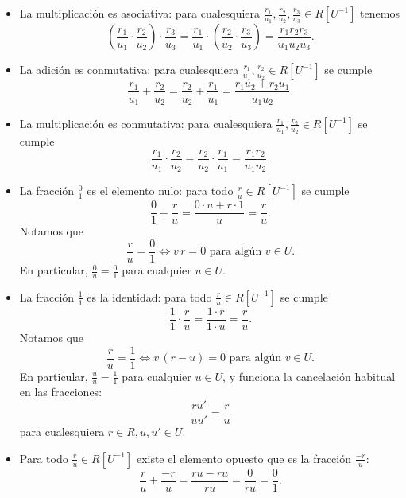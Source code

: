 \begin{construccion}
\begin{enumerate}
\begin{itemize}
    \item La multiplicación es asociativa: para cualesquiera
      $\frac{r_1}{u_1},\frac{r_2}{u_2},\frac{r_3}{u_3}\in R [U^{-1}]$ tenemos
      \[ \left(\frac{r_1}{u_1}\cdot \frac{r_2}{u_2}\right)\cdot \frac{r_3}{u_3} =
         \frac{r_1}{u_1}\cdot \left(\frac{r_2}{u_2}\cdot \frac{r_3}{u_3}\right) =
         \frac{r_1 r_2 r_3}{u_1 u_2 u_3}. \]

    \item La adición es conmutativa: para cualesquiera
      $\frac{r_1}{u_1}, \frac{r_2}{u_2}\in R [U^{-1}]$ se cumple
      \[ \frac{r_1}{u_1} + \frac{r_2}{u_2} =
         \frac{r_2}{u_2} + \frac{r_1}{u_1} =
         \frac{r_1u_2 + r_2u_1}{u_1u_2}. \]

    \item La multiplicación es conmutativa: para cualesquiera
      $\frac{r_1}{u_1}, \frac{r_2}{u_2}\in R [U^{-1}]$ se cumple
      \[ \frac{r_1}{u_1} \cdot \frac{r_2}{u_2} =
         \frac{r_2}{u_2} \cdot \frac{r_1}{u_1} = \frac{r_1r_2}{u_1u_2}. \]

    \item La fracción $\frac{0}{1}$ es el elemento nulo: para todo
      $\frac{r}{u}\in R [U^{-1}]$ se cumple
      $$\frac{0}{1}+\frac{r}{u} = \frac{0\cdot u + r\cdot 1}{u} = \frac{r}{u}.$$
      Notamos que
      $$\frac{r}{u} = \frac{0}{1} \iff v\,r = 0\text{ para algún }v\in U.$$
      En particular, $\frac{0}{u} = \frac{0}{1}$ para cualquier $u\in U$.

    \item La fracción $\frac{1}{1}$ es la identidad: para todo
      $\frac{r}{u}\in R [U^{-1}]$ se cumple
      $$\frac{1}{1}\cdot\frac{r}{u} = \frac{1\cdot r}{1\cdot u} = \frac{r}{u}.$$
      Notamos que
      $$\frac{r}{u} = \frac{1}{1} \iff v\,(r - u) = 0\text{ para algún }v\in U.$$
      En particular, $\frac{u}{u} = \frac{1}{1}$ para cualquier $u \in U$, y
      funciona la cancelación habitual en las fracciones:
      $$\frac{r u'}{u u'} = \frac{r}{u}$$
      para cualesquiera $r \in R, u, u' \in U$.

    \item Para todo $\frac{r}{u}\in R [U^{-1}]$ existe el elemento opuesto que
      es la fracción $\frac{-r}{u}$:
      $$\frac{r}{u} + \frac{-r}{u} = \frac{ru - ru}{ru} = \frac{0}{ru} = \frac{0}{1}.$$


\end{itemize}
\end{enumerate}
\end{construccion}
